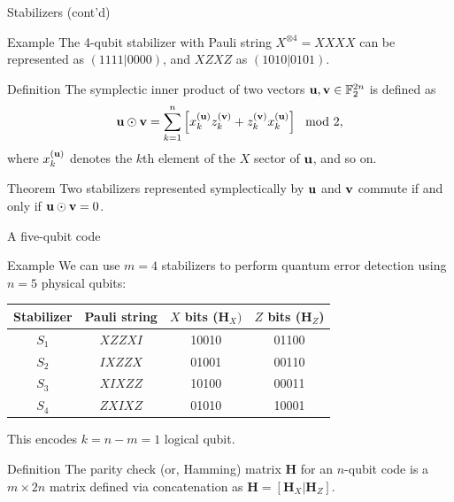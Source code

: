 \documentclass{beamer}
\newcommand{\F}{\mathbb F}
\renewcommand{\vec}{\textbf}
\begin{document}
\begin{frame}{Stabilizers (cont'd)}
    \begin{block}{Example}
        The 4-qubit stabilizer with Pauli string $X^{\otimes 4} = XXXX$ can be represented as $(1111|0000)$, and $XZXZ$ as $(1010|0101)$.
    \end{block}
    \begin{block}{Definition}
        The symplectic inner product of two vectors $\vec u, \vec v \in \F_2^{2n}$ is defined as
        $$ \vec u \odot \vec v = \sum_{k=1}^n \left [ x_k^{(\vec u)} z_k^{(\vec v)} + z_{k}^{(\vec v)}x_k^{(\vec u)}  \right] \mod 2, $$ where $x_k^{(\vec u)}$ denotes the $k$th element of the $X$ sector of $\vec u$, and so on.
    \end{block}
    \begin{block}{Theorem} %
        Two stabilizers represented symplectically by $\vec u$ and $\vec v$ commute if and only if $\vec u \odot \vec v = 0$.
    \end{block}
\end{frame}

\begin{frame}{A five-qubit code}
    \begin{block}{Example}
        We can use $m=4$ stabilizers to perform quantum error detection using $n=5$ physical qubits:
        \begin{center}
            \begin{tabular}{c|c|c|c}
                Stabilizer & Pauli string & $X$ bits ($\mathbf H_X)$ & $Z$ bits ($\mathbf H_Z$) \\
                \hline
                 $S_1$ & $XZZXI$ & 10010 & 01100 \\
                 $S_2$ & $IXZZX$ & 01001 & 00110 \\
                 $S_3$ & $XIXZZ$ & 10100 & 00011 \\
                 $S_4$ & $ZXIXZ$ & 01010 & 10001
            \end{tabular}
        \end{center}
    This encodes $k=n-m=1$ logical qubit.
    \end{block}
    \begin{block}{Definition}
        The parity check (or, Hamming) matrix $\mathbf H$ for an $n$-qubit code is a $m \times 2n$ matrix defined via concatenation as $\mathbf H=[\mathbf H_X | \mathbf H_Z]$.
    \end{block}
\end{frame}
\end{document}
